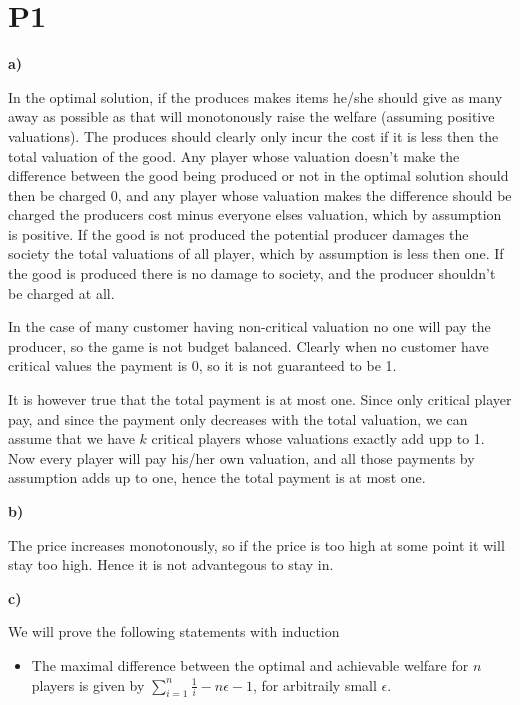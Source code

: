 
\section{P1}

\textbf{a)}

In the optimal solution, if the produces makes items he/she should give as many away as possible as that will monotonously raise the welfare (assuming positive valuations). The produces should clearly only incur the cost if it is less then the total valuation of the good. Any player whose valuation doesn't make the difference between the good being produced or not in the optimal solution should then be charged 0, and any player whose valuation makes the difference should be charged the producers cost minus everyone elses valuation, which by assumption is positive. If the good is not produced the potential producer damages the society the total valuations of all player, which by assumption is less then one. If the good is produced there is no damage to society, and the producer shouldn't be charged at all.


In the case of many customer having non-critical valuation no one will pay the producer, so the game is not budget balanced. Clearly when no customer have critical values the payment is 0, so it is not guaranteed to be 1. 

It is however true that the total payment is at most one. Since only critical player pay, and since the payment only decreases with the total valuation, we can assume that we have $k$ critical players whose valuations exactly add upp to 1. Now every player will pay his/her own valuation, and all those payments by assumption adds up to one, hence the total payment is at most one.

\textbf{b)}

The price increases monotonously, so if the price is too high at some point it will stay too high. Hence it is not advantegous to stay in.

\textbf{c)}

We will prove the following statements with induction

\begin{itemize}
\item The maximal difference between the optimal and achievable welfare for $n$ players is given by $\sum_{i=1}^n \frac{1}{i} - n \epsilon - 1$, for arbitraily small $\epsilon$.

\end{itemize}



